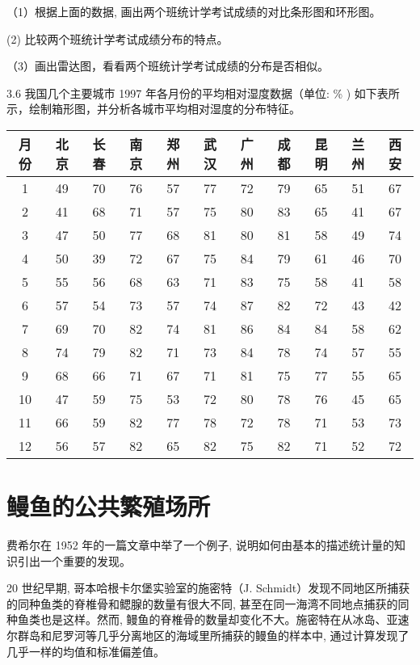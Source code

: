 \documentclass[10pt]{article}
\begin{document}
\begin{CJK*}{UTF8}{bsmi}
（1）根据上面的数据, 画出两个班统计学考试成绩的对比条形图和环形图。

(2) 比较两个班统计学考试成绩分布的特点。

（3）画出雷达图，看看两个班统计学考试成绩的分布是否相似。

3.6 我国几个主要城市 1997 年各月份的平均相对湿度数据（单位: \% ) 如下表所示，绘制箱形图，并分析各城市平均相对湿度的分布特征。

\begin{center}
\begin{tabular}{|c|c|c|c|c|c|c|c|c|c|c|}
\hline
月份 & 北京 & 长春 & 南京 & 郑州 & 武汉 & 广州 & 成都 & 昆明 & 兰州 & 西安 \\
\hline
1 & 49 & 70 & 76 & 57 & 77 & 72 & 79 & 65 & 51 & 67 \\
\hline
2 & 41 & 68 & 71 & 57 & 75 & 80 & 83 & 65 & 41 & 67 \\
\hline
3 & 47 & 50 & 77 & 68 & 81 & 80 & 81 & 58 & 49 & 74 \\
\hline
4 & 50 & 39 & 72 & 67 & 75 & 84 & 79 & 61 & 46 & 70 \\
\hline
5 & 55 & 56 & 68 & 63 & 71 & 83 & 75 & 58 & 41 & 58 \\
\hline
6 & 57 & 54 & 73 & 57 & 74 & 87 & 82 & 72 & 43 & 42 \\
\hline
7 & 69 & 70 & 82 & 74 & 81 & 86 & 84 & 84 & 58 & 62 \\
\hline
8 & 74 & 79 & 82 & 71 & 73 & 84 & 78 & 74 & 57 & 55 \\
\hline
9 & 68 & 66 & 71 & 67 & 71 & 81 & 75 & 77 & 55 & 65 \\
\hline
10 & 47 & 59 & 75 & 53 & 72 & 80 & 78 & 76 & 45 & 65 \\
\hline
11 & 66 & 59 & 82 & 77 & 78 & 72 & 78 & 71 & 53 & 73 \\
\hline
12 & 56 & 57 & 82 & 65 & 82 & 75 & 82 & 71 & 52 & 72 \\
\hline
\end{tabular}
\end{center}

\begin{center}
\end{center}

\section*{鳗鱼的公共繁殖场所}
费希尔在 1952 年的一篇文章中举了一个例子, 说明如何由基本的描述统计量的知识引出一个重要的发现。

20 世纪早期, 哥本哈根卡尔堡实验室的施密特（J. Schmidt）发现不同地区所捕获的同种鱼类的脊椎骨和鳃腺的数量有很大不同, 甚至在同一海湾不同地点捕获的同种鱼类也是这样。然而, 鳗鱼的脊椎骨的数量却变化不大。施密特在从冰岛、亚速尔群岛和尼罗河等几乎分离地区的海域里所捕获的鳗鱼的样本中, 通过计算发现了几乎一样的均值和标准偏差值。


\end{CJK*}
\end{document}
